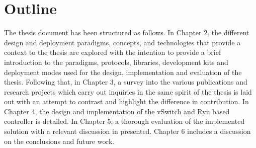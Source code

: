 \section{Outline}
The thesis document has been structured as follows. In Chapter 2, the different design and deployment paradigms, concepts, and technologies that provide a context to the thesis are explored with the intention to provide a brief introduction  to the paradigms, protocols, libraries, development kits and deployment modes used for the design, implementation and evaluation of the thesis. Following that, in Chapter 3, a survey into the various publications and research projects which carry out inquiries in the same spirit of the thesis is laid out with an attempt to contrast and highlight the difference in contribution. In Chapter 4, the design and implementation of the vSwitch and Ryu based controller is detailed. In Chapter 5, a thorough evaluation of the implemented solution with a relevant discussion in presented. Chapter 6 includes a discussion on the conclusions and future work.





